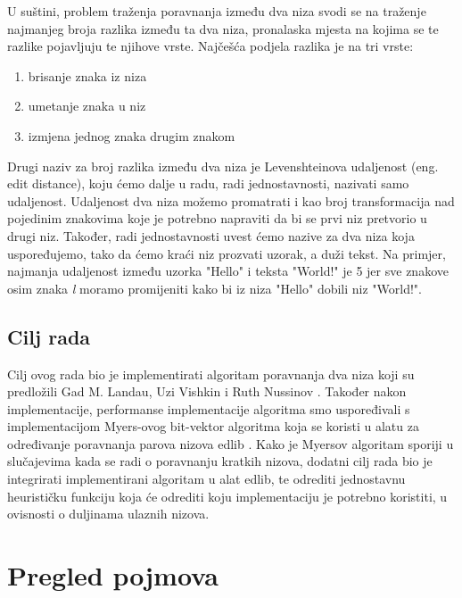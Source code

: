 \documentclass[times, utf8, zavrsni]{fer}
\begin{document}
U suštini, problem traženja poravnanja između dva niza svodi se na traženje najmanjeg broja razlika između ta dva niza, pronalaska mjesta na kojima se te razlike pojavljuju te njihove vrste. Najčešća podjela razlika je na tri vrste:
\begin{enumerate}
\item brisanje znaka iz niza
\item umetanje znaka u niz
\item izmjena jednog znaka drugim znakom
\end{enumerate}
Drugi naziv za broj razlika između dva niza je Levenshteinova udaljenost (eng. edit distance), koju ćemo dalje u radu, radi jednostavnosti, nazivati samo udaljenost. Udaljenost dva niza možemo promatrati i kao broj transformacija nad pojedinim znakovima koje je potrebno napraviti da bi se prvi niz pretvorio u drugi niz. Također, radi jednostavnosti uvest ćemo nazive za dva niza koja uspoređujemo, tako da ćemo kraći niz prozvati uzorak, a duži tekst. Na primjer, najmanja udaljenost između uzorka "Hello" i teksta "World!" je 5 jer sve znakove osim znaka \textit{l} moramo promijeniti kako bi iz niza "Hello" dobili niz "World!".

\section{Cilj rada}
Cilj ovog rada bio je implementirati algoritam poravnanja dva niza koji su predložili Gad M. Landau, Uzi Vishkin i Ruth Nussinov \citep{Landau1986}. Također nakon implementacije, performanse implementacije algoritma smo uspoređivali s implementacijom Myers-ovog bit-vektor algoritma \citep{Myers1999} koja se koristi u alatu za određivanje poravnanja parova nizova edlib \citep{edlib}. Kako je Myersov algoritam sporiji u slučajevima kada se radi o poravnanju kratkih nizova, dodatni cilj rada bio je integrirati implementirani algoritam u alat edlib, te odrediti jednostavnu heurističku funkciju koja će odrediti koju implementaciju je potrebno koristiti, u ovisnosti o duljinama ulaznih nizova.

\chapter{Pregled pojmova}
\end{document}
